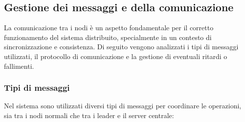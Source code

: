 \documentclass[12pt, a4paper]{report}
\begin{document}
\subsection{Gestione dei messaggi e della comunicazione}\label{sec:gestione_messaggi}

La comunicazione tra i nodi \`e un aspetto fondamentale per il corretto funzionamento del sistema distribuito, specialmente in un contesto di sincronizzazione e consistenza. Di seguito vengono analizzati i tipi di messaggi utilizzati, il protocollo di comunicazione e la gestione di eventuali ritardi o fallimenti.

\subsubsection{Tipi di messaggi}
\label{sec:tipi_di_messaggi}

Nel sistema sono utilizzati diversi tipi di messaggi per coordinare le operazioni, sia tra i nodi normali che tra i leader e il server centrale:
\end{document}
